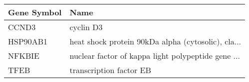 \begin{tabular}{ll}
\toprule
Gene Symbol &                                               Name \\
\midrule
      CCND3 &                                          cyclin D3 \\
   HSP90AB1 & heat shock protein 90kDa alpha (cytosolic), cla... \\
     NFKBIE & nuclear factor of kappa light polypeptide gene ... \\
       TFEB &                            transcription factor EB \\
\bottomrule
\end{tabular}
